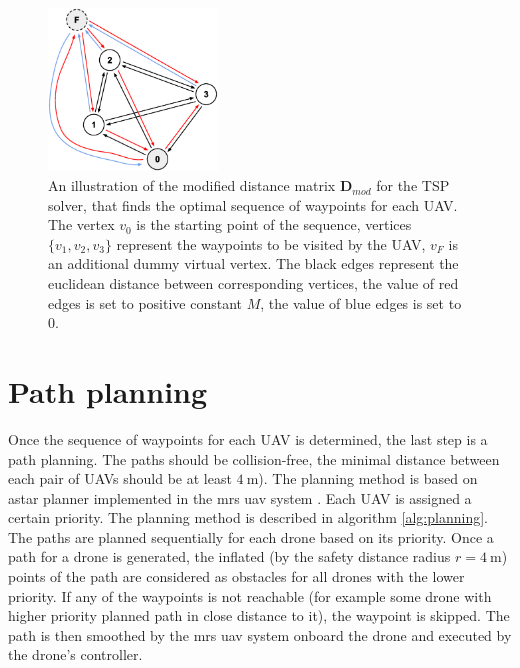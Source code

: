 \begin{figure}[!h]
    \centering
    \includegraphics[width=0.4\textwidth]{./fig/photos/TSP.eps}
    \caption{An illustration of the modified distance matrix $\mathbf{D}_{mod}$ for the \ac{TSP} solver, that finds the optimal sequence of waypoints for each \ac{UAV}. 
    The vertex $v_{0}$ is the starting point of the sequence, vertices $\{v_{1}, v_{2}, v_{3}\}$ represent the waypoints to be visited by the \ac{UAV}, $v_{F}$ is an additional dummy virtual vertex. 
    The black edges represent the euclidean distance between corresponding vertices, the value of red edges is set to positive constant $M$, the value of blue edges is set to $0$. }
    \label{fig:tsp}
\end{figure}

\section{Path planning}%
Once the sequence of waypoints for each \ac{UAV} is determined, the last step is a path planning.
The paths should be collision-free, the minimal distance between each pair of \ac{UAV}s should be at least $\SI{4}\meter$).
The planning method is based on astar planner implemented in the mrs uav system \cite{mrs_system}.
Each \ac{UAV} is assigned a certain priority.
The planning method is described in algorithm \autoref{alg:planning}.
The paths are planned sequentially for each drone based on its priority.
Once a path for a drone is generated, the inflated (by the safety distance radius $r = \SI{4}\meter$) points of the path are considered as obstacles for all drones with the lower priority.
If any of the waypoints is not reachable (for example some drone with higher priority planned path in close distance to it), the waypoint is skipped.
The path is then smoothed by the mrs uav system \cite{mrs_system} onboard the drone and executed by the drone's controller.







